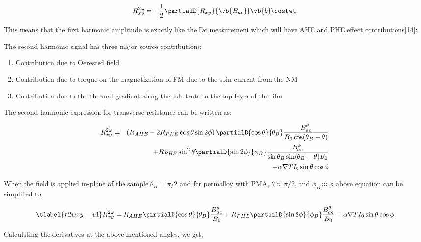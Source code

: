 \begin{equation}
    R^{2 \omega}_{xy}  = - \frac{1}{2} \partialD{R_{xy}}{\vb{B_{ac}}} \vb{b} \costwt
\end{equation}

This means that the first harmonic amplitude is exactly like the Dc measurement which 
will have AHE and PHE effect contributions[14]:

The second harmonic signal has three major source contributions:

\begin{enumerate}
    \item Contribution due to Oerested field
    \item Contribution due to torque on  the magnetization of FM due to the spin current 
    from the NM
    \item Contribution due to the thermal gradient along the substrate to the top layer of
     the film
\end{enumerate}

The second harmonic expression for transverse resistance can be written as:

\begin{eqnarray} \nonumber
        R^{2 \omega}_{xy}  &=& \left( R_{AHE} - 2 R_{PHE} \cos{\theta} \sin{2 \phi} \right)
        \partialD{\cos{\theta}}{\theta_{B}} \frac{B^{\theta}_{ac}}{B_{0} \cos ({\theta_{B} - \theta})} \\
        && \nonumber + R_{PHE} \sin ^{2} {\theta} \partialD{\sin {2\phi}}{\phi_{B}} 
        \frac{B^{\phi}_{ac}}{\sin {\theta_{B}}  \sin ({\theta_{B} - \theta}) B_{0}} \\
        && + \alpha \nabla {T} I_{0} \sin{\theta}\cos{\phi}
\end{eqnarray}

When the field is applied in-plane of the sample $\theta_{B}=\pi/2$ and for permalloy with PMA, 
$\theta \approx \pi/2$, and $\phi_{B} \approx \phi$  above equation can be simplified to:


\begin{equation}
    \tlabel{r2wxy-v1}
    R^{2 \omega}_{xy}  = R_{AHE} \partialD{\cos{\theta}}
    {\theta_B} \frac{B^{\theta}_{ac}}{B_{0}} + R_{PHE} 
    \partialD{\sin{2\phi}}{\phi_B} \frac{B^{\theta}_{ac}}{B_{0}}  + 
    \alpha \nabla {T} I_{0} \sin{\theta} \cos{\phi}
\end{equation}

Calculating the derivatives at the above mentioned angles, we get,

